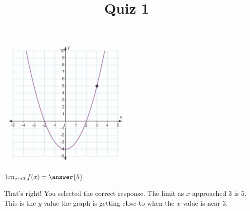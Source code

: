 \documentclass{ximera}
\title{Quiz 1}
\begin{document}
\begin{abstract}
\end{abstract}

\maketitle

\includegraphics[width=0.5\textwidth]{graph1.png}
\begin{question}  
$\lim_{x \to 3} f(x) = \answer{5}$  

\begin{explanation}
    That's right! You selected the correct response. The limit as $x$ approached $3$ is $5$. This is the $y$-value the graph is getting close to when the $x$-value is near $3$.
\end{explanation}
\end{question}
\end{document}
